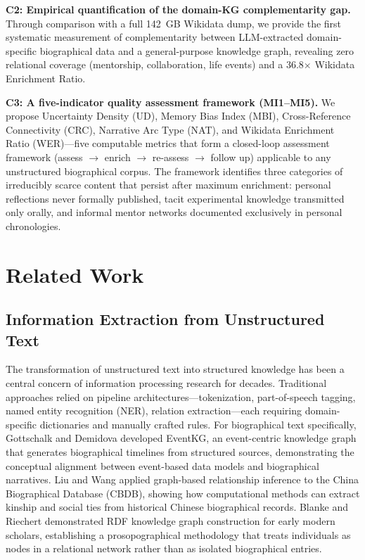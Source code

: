 \documentclass[review]{elsarticle}
\begin{document}
\textbf{C2: Empirical quantification of the domain-KG complementarity gap.} Through comparison with a full 142~GB Wikidata dump, we provide the first systematic measurement of complementarity between LLM-extracted domain-specific biographical data and a general-purpose knowledge graph, revealing zero relational coverage (mentorship, collaboration, life events) and a 36.8$\times$ Wikidata Enrichment Ratio.

\textbf{C3: A five-indicator quality assessment framework (MI1--MI5).} We propose Uncertainty Density (UD), Memory Bias Index (MBI), Cross-Reference Connectivity (CRC), Narrative Arc Type (NAT), and Wikidata Enrichment Ratio (WER)—five computable metrics that form a closed-loop assessment framework (assess $\rightarrow$ enrich $\rightarrow$ re-assess $\rightarrow$ follow up) applicable to any unstructured biographical corpus. The framework identifies three categories of irreducibly scarce content that persist after maximum enrichment: personal reflections never formally published, tacit experimental knowledge transmitted only orally, and informal mentor networks documented exclusively in personal chronologies.

\section{Related Work}

\subsection{Information Extraction from Unstructured Text}

The transformation of unstructured text into structured knowledge has been a central concern of information processing research for decades. Traditional approaches relied on pipeline architectures—tokenization, part-of-speech tagging, named entity recognition (NER), relation extraction—each requiring domain-specific dictionaries and manually crafted rules. For biographical text specifically, Gottschalk and Demidova \cite{gottschalk2019eventkg} developed EventKG, an event-centric knowledge graph that generates biographical timelines from structured sources, demonstrating the conceptual alignment between event-based data models and biographical narratives. Liu and Wang \cite{liu2017matrix} applied graph-based relationship inference to the China Biographical Database (CBDB), showing how computational methods can extract kinship and social ties from historical Chinese biographical records. Blanke and Riechert \cite{blanke2020rdf} demonstrated RDF knowledge graph construction for early modern scholars, establishing a prosopographical methodology that treats individuals as nodes in a relational network rather than as isolated biographical entries.
\end{document}
